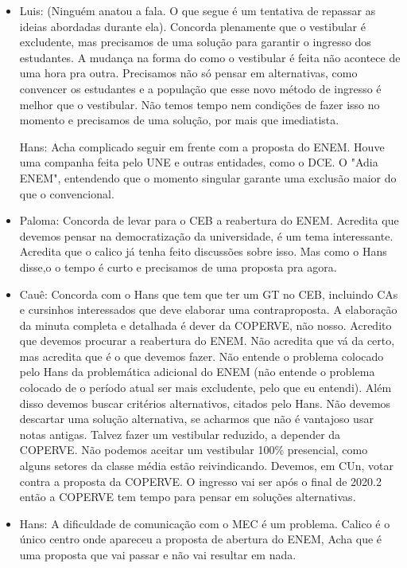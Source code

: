 \documentclass{ata-calico}
\begin{document}
\begin{itemize}
    \item Luis: (Ninguém anatou a fala. O que segue é um tentativa de repassar as ideias abordadas durante ela). Concorda plenamente que o vestibular é excludente, mas precisamos de uma solução para garantir o ingresso dos estudantes. A mudança na forma do como o vestibular é feita não acontece de uma hora pra outra. Precisamos não só pensar em alternativas, como convencer os estudantes e a população que esse novo método de ingresso é melhor que o vestibular. Não temos tempo nem condições de fazer isso no momento e precisamos de uma solução, por mais que imediatista.
    
    \tem Hans: Acha complicado seguir em frente com a proposta do ENEM. Houve uma companha feita pelo UNE e outras entidades, como o DCE. O "Adia ENEM", entendendo que o momento singular garante uma exclusão maior do que o convencional. 
    
    \item Paloma: Concorda de levar para o CEB a reabertura do ENEM. Acredita que devemos pensar na democratização da universidade, é um tema interessante. Acredita que o calico já tenha feito discussões sobre isso. Mas como o Hans disse,o o tempo é curto e precisamos de uma proposta pra agora.
    
    \item Cauê: Concorda com o Hans que tem que ter um GT no CEB, incluindo CAs e cursinhos interessados que deve elaborar uma contraproposta. A elaboração da minuta completa e detalhada é dever da COPERVE, não nosso. Acredito que devemos procurar a reabertura do ENEM. Não acredita que vá da certo, mas acredita que é o que devemos fazer. Não entende o problema colocado pelo Hans da problemática adicional do ENEM (não entende o problema colocado de o período atual ser mais excludente, pelo que eu entendi). Além disso devemos buscar critérios alternativos, citados pelo Hans. Não devemos descartar uma solução alternativa, se acharmos que não é vantajoso usar notas antigas. Talvez fazer um vestibular reduzido, a depender da COPERVE. Não podemos aceitar um vestibular 100\% presencial, como alguns setores da classe média estão reivindicando. Devemos, em CUn, votar contra a proposta da COPERVE. O ingresso vai ser após o final de 2020.2 então a COPERVE tem tempo para pensar em soluções alternativas.
    
    \item Hans: A dificuldade de comunicação com o MEC é um problema. Calico é o único centro onde apareceu a proposta de abertura do ENEM, Acha que é uma proposta que vai passar e não vai resultar em nada.
    

\end{itemize}
\end{document}
